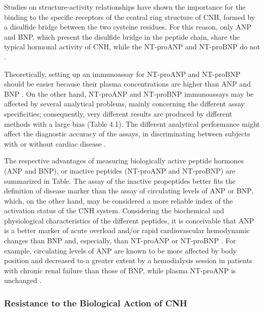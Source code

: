 \documentclass[14pt,a4paper,onecolumn]{extarticle}
\begin{document}
Studies on structure-activity relationships have shown the importance for the binding to the specific receptors of the central ring structure of CNH, formed by a disulfide bridge between the two cysteine  residues. For this reason, only ANP and BNP, which present the disulfide bridge in the peptide chain, share the typical hormonal activity of CNH, while the NT-proANP and NT-proBNP do not \citep{bib31} \citep{bib32} \citep{bib33} \citep{bib34} \citep{bib35} \citep{bib36} \citep{bib37}.

Theoretically, setting up an immunoassay for NT-proANP and NT-proBNP should be easier because their plasma concentrations are higher than ANP and BNP \citep{bib318}.  On the other hand, NT-proANP and NT-proBNP immunoassays may be affected by several analytical problems, mainly concerning the different assay specificities; consequently, very different results are produced by different methods with a large bias \citep{bib32} \citep{bib35} \citep{bib36} \citep{bib318} (Table 4.1). The different analytical performance might affect the diagnostic accuracy of the assays, in discriminating between subjects with or without cardiac disease \citep{bib32} \citep{bib35} \citep{bib36}.

The respective advantages of measuring biologically active peptide hormones (ANP and BNP), or inactive peptides (NT-proANP and NT-proBNP) are summarized in Table. The assay of the inactive propeptides better fits the definition of disease marker than the assay of circulating levels of ANP or BNP, which, on the other hand, may be considered a more reliable index of the activation status of the CNH system. Considering the biochemical and physiological characteristics of the different peptides, it is conceivable that ANP is a better marker of acute overload and/or rapid cardiovascular hemodynamic changes than BNP and, especially, than NT-proANP or NT-proBNP \citep{bib32} \citep{bib35}. For example, circulating levels of ANP are known to be more affected by body position and decreased to a greater extent by a hemodialysis session in patients with chronic renal failure than those of BNP, while plasma NT-proANP is unchanged \citep{bib322}.%

\subsubsection{ Resistance to the Biological Action of CNH}
\end{document}
